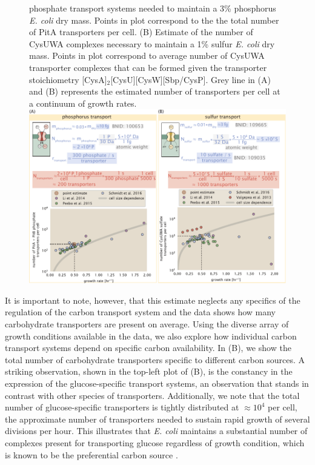 \begin{figure}
\begin{fullwidth}
{    phosphate transport systems needed to maintain a 3\% phosphorus \textit{E.
    coli} dry mass. Points in plot correspond to the the total number of PitA
    transporters per cell. (B) Estimate of the number of CysUWA complexes
    necessary to maintain a 1\% sulfur \textit{E. coli} dry mass. Points in plot
    correspond to average number of CysUWA transporter complexes that can be
    formed given the transporter stoichiometry [CysA]$_2$[CysU][CysW][Sbp/CysP].
    Grey line in (A) and (B) represents the estimated number of transporters per
    cell at a continuum of growth
    rates.}{\includegraphics{main_figs/fig3_phospho_sulfo_transport.pdf}}\label{figsupp:phospho_sulfo}
    \end{fullwidth}
\end{figure}

It is important to note, however, that this estimate neglects any specifics of the
regulation of the carbon transport system and the data shows how many
carbohydrate transporters are present on average. Using the diverse array of
growth conditions available in the data, we also explore how individual carbon
transport systems depend on specific carbon availability. In
(B), we show the total number of carbohydrate transporters
specific to different carbon sources. A striking observation, shown in the
top-left plot of (B), is the constancy in the expression of
the glucose-specific transport systems, an observation that stands in contrast
with other species of transporters. Additionally, we note that the total
number of glucose-specific transporters is tightly distributed at $\approx 10^4$
per cell, the approximate number of transporters needed to sustain rapid growth
of several divisions per hour. This illustrates that \textit{E. coli} maintains
a substantial number of complexes present for transporting glucose regardless of
growth condition, which is known to be the preferential carbon source
\citep{monod1947, liu2005a, aidelberg2014}.

